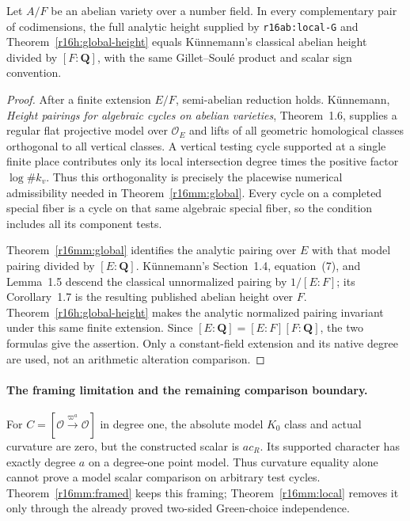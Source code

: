 \begin{corollary}
\label{r16mm:abelian}
Let $A/F$ be an abelian variety over a number field. In every
complementary pair of codimensions, the full analytic height
supplied by \texttt{r16ab:local-G} and
Theorem~\ref{r16h:global-height} equals K\"unnemann's classical
abelian height divided by $[F:\mathbf Q]$, with the same
Gillet--Soul\'e product and scalar sign convention.
\end{corollary}

\begin{proof}
After a finite extension $E/F$, semi-abelian reduction holds.
K\"unnemann, \emph{Height pairings for algebraic cycles on abelian
varieties}, Theorem~1.6, supplies a regular flat projective
model over $\mathcal O_E$ and lifts of all geometric homological
classes orthogonal to all vertical classes. A vertical testing
cycle supported at a single finite place contributes only its
local intersection degree times the positive factor
$\log\#k_v$. Thus this orthogonality is precisely the
placewise numerical admissibility needed in
Theorem~\ref{r16mm:global}. Every cycle on a completed special
fiber is a cycle on that same algebraic special fiber, so the
condition includes all its component tests.

Theorem~\ref{r16mm:global} identifies the analytic pairing over
$E$ with that model pairing divided by $[E:\mathbf Q]$.
K\"unnemann's Section~1.4, equation~(7), and Lemma~1.5 descend
the classical unnormalized pairing by $1/[E:F]$; its Corollary~1.7
is the resulting published abelian height over $F$.
Theorem~\ref{r16h:global-height} makes the analytic normalized
pairing invariant under this same finite extension. Since
$[E:\mathbf Q]=[E:F][F:\mathbf Q]$, the two formulas give the
assertion. Only a constant-field extension and its native degree
are used, not an arithmetic alteration comparison.
\end{proof}

\paragraph{The framing limitation and the remaining comparison boundary.}
For $C=[\mathcal O\xrightarrow{\varpi^a}\mathcal O]$ in degree
one, the absolute model $K_0$ class and actual curvature are
zero, but the constructed scalar is $a c_R$. Its supported
character has exactly degree $a$ on a degree-one point model.
Thus curvature equality alone cannot prove a model scalar
comparison on arbitrary test cycles. Theorem~\ref{r16mm:framed}
keeps this framing; Theorem~\ref{r16mm:local} removes it only
through the already proved two-sided Green-choice independence.

